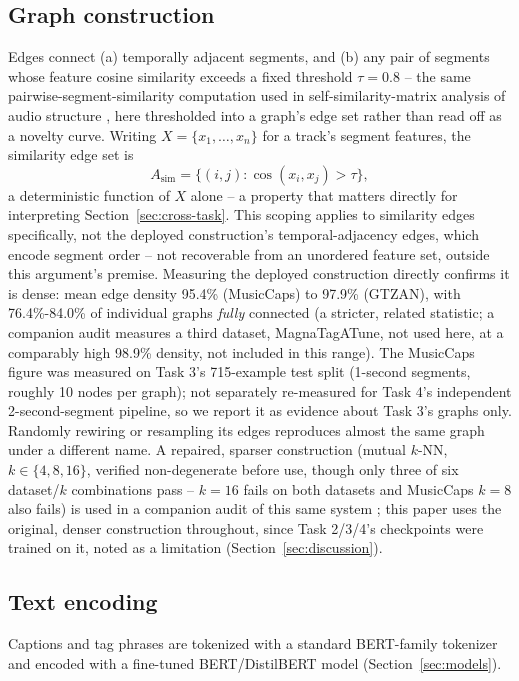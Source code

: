 \subsection{Graph construction}
Edges connect (a) temporally adjacent segments, and (b) any pair of segments whose feature
cosine similarity exceeds a fixed threshold $\tau=0.8$ -- the same pairwise-segment-similarity
computation used in self-similarity-matrix analysis of audio structure \cite{foote2000novelty},
here thresholded into a graph's edge set rather than read off as a novelty curve. Writing
$X=\{x_1,\dots,x_n\}$ for a track's segment features, the similarity edge set is
\[
A_{\mathrm{sim}} = \{(i,j) : \cos(x_i,x_j) > \tau\},
\]
a deterministic function of $X$ alone -- a property that matters directly for interpreting
Section~\ref{sec:cross-task}. This scoping applies to similarity edges specifically, not the
deployed construction's temporal-adjacency edges, which encode segment order -- not
recoverable from an unordered feature set, outside this argument's premise. Measuring the
deployed construction directly confirms it is dense: mean edge density 95.4\% (MusicCaps) to
97.9\% (GTZAN), with 76.4\%-84.0\% of individual graphs \emph{fully} connected (a stricter,
related statistic; a companion audit measures a third dataset, MagnaTagATune, not used here,
at a comparably high 98.9\% density, not included in this range). The MusicCaps figure was
measured on Task 3's 715-example test split (1-second segments, roughly 10 nodes per graph);
not separately re-measured for Task 4's independent 2-second-segment pipeline, so we report
it as evidence about Task 3's graphs only. Randomly rewiring or resampling its edges
reproduces almost the same graph under a different name. A repaired, sparser construction
(mutual $k$-NN, $k\in\{4,8,16\}$, verified non-degenerate before use, though only three of
six dataset/$k$ combinations pass -- $k{=}16$ fails on both datasets and MusicCaps $k{=}8$
also fails) is used in a companion audit of this same system \cite{tismir_audit}; this paper
uses the original, denser construction throughout, since Task 2/3/4's checkpoints were
trained on it, noted as a limitation (Section~\ref{sec:discussion}).

\subsection{Text encoding}
Captions and tag phrases are tokenized with a standard BERT-family tokenizer and encoded
with a fine-tuned BERT/DistilBERT model (Section~\ref{sec:models}).


